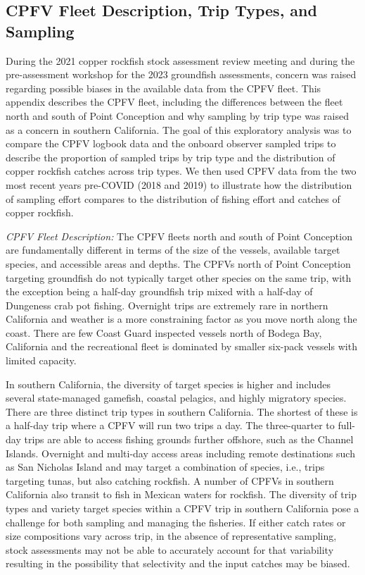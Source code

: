 \documentclass[11pt,
  english,
  letterpaper,
]{article}
\begin{document}
\newpage

\hypertarget{cpfv-samples}{%
\subsection{CPFV Fleet Description, Trip Types, and Sampling}\label{cpfv-samples}}

During the 2021 copper rockfish stock assessment review meeting and during the pre-assessment workshop for the 2023 groundfish assessments, concern was raised regarding possible biases in the available data from the CPFV fleet. This appendix describes the CPFV fleet, including the differences between the fleet north and south of Point Conception and why sampling by trip type was raised as a concern in southern California. The goal of this exploratory analysis was to compare the CPFV logbook data and the onboard observer sampled trips to describe the proportion of sampled trips by trip type and the distribution of copper rockfish catches across trip types. We then used CPFV data from the two most recent years pre-COVID (2018 and 2019) to illustrate how the distribution of sampling effort compares to the distribution of fishing effort and catches of copper rockfish.

\emph{CPFV Fleet Description:} The CPFV fleets north and south of Point Conception are fundamentally different in terms of the size of the vessels, available target species, and accessible areas and depths. The CPFVs north of Point Conception targeting groundfish do not typically target other species on the same trip, with the exception being a half-day groundfish trip mixed with a half-day of Dungeness crab pot fishing. Overnight trips are extremely rare in northern California and weather is a more constraining factor as you move north along the coast. There are few Coast Guard inspected vessels north of Bodega Bay, California and the recreational fleet is dominated by smaller six-pack vessels with limited capacity.

In southern California, the diversity of target species is higher and includes several state-managed gamefish, coastal pelagics, and highly migratory species. There are three distinct trip types in southern California. The shortest of these is a half-day trip where a CPFV will run two trips a day. The three-quarter to full-day trips are able to access fishing grounds further offshore, such as the Channel Islands. Overnight and multi-day access areas including remote destinations such as San Nicholas Island and may target a combination of species, i.e., trips targeting tunas, but also catching rockfish. A number of CPFVs in southern California also transit to fish in Mexican waters for rockfish. The diversity of trip types and variety target species within a CPFV trip in southern California pose a challenge for both sampling and managing the fisheries. If either catch rates or size compositions vary across trip, in the absence of representative sampling, stock assessments may not be able to accurately account for that variability resulting in the possibility that selectivity and the input catches may be biased.
\end{document}
